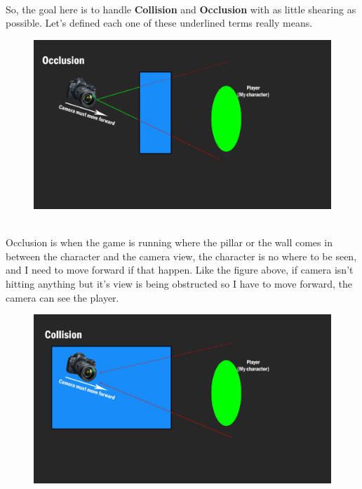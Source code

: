 \documentclass[a4paper, 13pt]{extarticle}
\begin{document}
  \\[0.15cm]
  So, the goal here is to handle {\bfseries Collision} and {\bfseries Occlusion} with as little shearing as possible. Let's defined each one of these underlined terms really means. 
  \begin{figure}[h]
  	\centering
  	\begin{minipage}{.4\textwidth}
  		\centering
  		\includegraphics[width=1.3\linewidth]{intructions/Occlusion_camera.png}
  		\centering
  		\label{fig:test10}
  	\end{minipage}
  \end{figure}
  \\[0.15cm]
  Occlusion is when the game is running where the pillar or the wall comes in between the character and the camera view, the character is no where to be seen, and I need to move forward if that happen. Like the figure above, if camera isn't hitting anything but it's view is being obstructed so I have to move forward, the camera can see the player. 
  \begin{figure}[h]
  	\centering
  	\begin{minipage}{.4\textwidth}
  		\centering
  		\includegraphics[width=1.3\linewidth]{intructions/Collision_camera.png}
  		\centering
  		\label{fig:test11}
  	\end{minipage}
  \end{figure}
\end{document}
